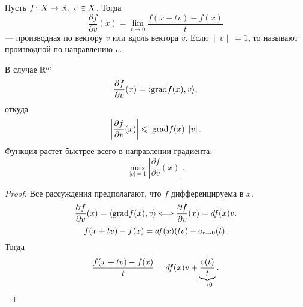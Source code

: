 \begin{defn}
    Пусть $ f \colon X \to  \mathbb{R}, ~ v \in X$. Тогда 
    \[
	\frac{ \partial f}{ \partial v}(x) = \lim_{t \to  0} \frac{f(x+tv) - f(x)}{t}
    \] 
    --- {\sf производная по вектору} $ v$ или {\sf вдоль вектора}  $ v$. Если  $ \| v \| = 1$, то называют {\sf производной по направлению} $ v$.  
\end{defn}
\begin{prop}
    В случае $ \mathbb{R}^{m} $ 
    \[
	\frac{ \partial f}{ \partial v} (x) = \langle {\mathop{\text{\rm grad}}} f(x), v \rangle
    ,\] 
    откуда
    \[
	\left| \frac{ \partial f}{ \partial v}(x) \right| \leqslant \left| {\mathop{\text{\rm grad}}} f(x) \right| \left| v \right| 
    .\] 
    Функция растет быстрее всего в направлении градиента:
    \[
	\max_{\left| v \right| = 1} \left| \frac{ \partial f}{ \partial v} (x)\right| 
    .\] 
\end{prop}
\begin{proof}
    Все рассуждения предполагают, что $ f$ дифференцируема в $ x$.
     \[
	 \frac{ \partial f}{ \partial v} (x) = \langle {\mathop{\text{\rm grad}}} f(x), v \rangle \Longleftrightarrow \frac{ \partial f}{ \partial v} (x) = df(x) v
 .\] 
 \[
     f(x+tv) - f(x) = df(x)(tv) + {\mathop{\text{\rm o}}}_{t \to  0}(t)
 .\] 
 Тогда 
 \[
     \frac{ f(x + tv) -f(x)}{t} = df(x) v + \underbrace{\frac{ {\mathop{\text{\rm o}}}(t)}{t}}_{ \to  0}
 .\] 
\end{proof}
